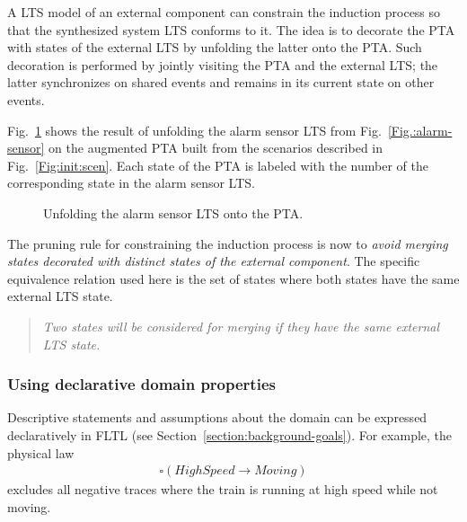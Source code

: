 A LTS model of an external component can constrain the induction process so that the synthesized system LTS conforms to it. The idea is to decorate the PTA with states of the external LTS by unfolding the latter onto the PTA. Such decoration is performed by jointly visiting the PTA and the external LTS; the latter synchronizes on shared events and remains in its current state on other events.

Fig.~\ref{Fig.:alarm-unfolded-pta} shows the result of unfolding the alarm sensor LTS from Fig.~\ref{Fig.:alarm-sensor} on the augmented PTA built from the scenarios described in Fig.~\ref{Fig:init:scen}. Each state of the PTA is labeled with the number of the corresponding state in the alarm sensor LTS. 

\begin{figure}
\centering
{}
\caption{Unfolding the alarm sensor LTS onto the PTA\label{Fig.:alarm-unfolded-pta}.}
\end{figure}

The pruning rule for constraining the induction process is now to \emph{avoid merging states decorated with distinct states of the external component}. The specific equivalence relation used here is the set of states where both states have the same external LTS state. 

\begin{quote}
\emph{Two states will be considered for merging if they have the same external LTS state.}
\end{quote}


\subsubsection*{Using declarative domain properties}

Descriptive statements and assumptions about the domain can be expressed declaratively in FLTL (see Section~\ref{section:background-goals}). For example, the physical law
\begin{align*}
\square(HighSpeed \rightarrow Moving)
\end{align*}
\noindent excludes all negative traces where the train is running at high speed while not moving. 


